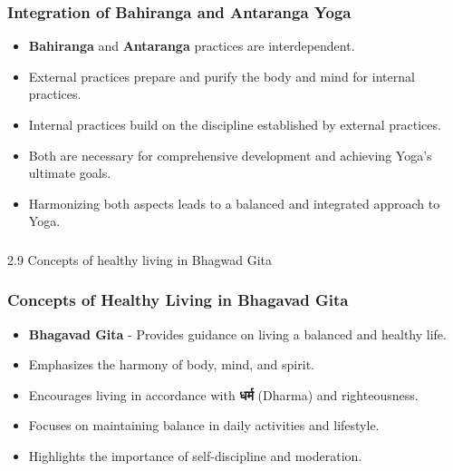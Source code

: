 \begin{frame}[fragile]\frametitle{Integration of Bahiranga and Antaranga Yoga}

      \begin{itemize}
		\item \textbf{Bahiranga} and \textbf{Antaranga} practices are interdependent.
		\item External practices prepare and purify the body and mind for internal practices.
		\item Internal practices build on the discipline established by external practices.
		\item Both are necessary for comprehensive development and achieving Yoga’s ultimate goals.
		\item Harmonizing both aspects leads to a balanced and integrated approach to Yoga.
	  \end{itemize}

\end{frame}


\begin{frame}[fragile]\frametitle{}
\begin{center}
{\Large 2.9  Concepts of healthy living in Bhagwad Gita}
\end{center}
\end{frame}

\begin{frame}[fragile]\frametitle{Concepts of Healthy Living in Bhagavad Gita}

      \begin{itemize}
		\item \textbf{Bhagavad Gita} - Provides guidance on living a balanced and healthy life.
		\item Emphasizes the harmony of body, mind, and spirit.
		\item Encourages living in accordance with \textbf{धर्म} (Dharma) and righteousness.
		\item Focuses on maintaining balance in daily activities and lifestyle.
		\item Highlights the importance of self-discipline and moderation.
	  \end{itemize}

\end{frame}

